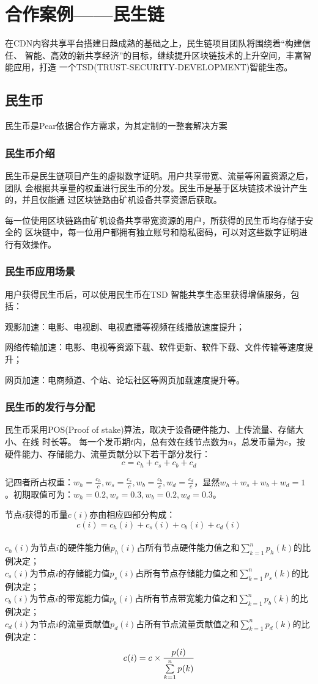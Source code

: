 \chapter{合作案例——民生链}
在CDN内容共享平台搭建日趋成熟的基础之上，民生链项目团队将围绕着“构建信任、
智能、⾼效的新共享经济”的目标，继续提升区块链技术的上升空间，丰富智能应用，打造
一个TSD(TRUST-SECURITY-DEVELOPMENT)智能生态。
\section{民生币}
民生币是Pear依据合作方需求，为其定制的一整套解决方案
\subsection{民生币介绍}
民生币是民生链项目产生的虚拟数字证明。用户共享带宽、流量等闲置资源之后，团队
会根据共享量的权重进行民生币的分发。民生币是基于区块链技术设计产生的，并且仅能通
过区块链路由矿机设备共享资源后获取。\par 
每一位使用区块链路由矿机设备共享带宽资源的用户，所获得的民生币均存储于安全的
区块链中，每一位用户都拥有独立账号和隐私密码，可以对这些数字证明进行有效操作。
\subsection{民生币应用场景}
用户获得民生币后，可以使用民生币在TSD 智能共享生态里获得增值服务，包括：\par 
观影加速：电影、电视剧、电视直播等视频在线播放速度提升；\par 
网络传输加速：电影、电视等资源下载、软件更新、软件下载、文件传输等速度提升；\par 
网页加速：电商频道、个站、论坛社区等网页加载速度提升等。
\subsection{民生币的发行与分配}
民生币采用POS(Proof of stake)算法，取决于设备硬件能力、上传流量、存储大小、在线
时长等。
每一个发币期$t$内，总有效在线节点数为$n$，总发币量为$c$，按硬件能力、存储能力、流量贡献分以下若干部分发行：
  $$c = c_h + c_s + c_b + c_d$$

记四者所占权重：$w_h = \frac{c_h}{c}, w_s = \frac{c_s}{c}, w_b = \frac{c_b}{c}, w_d = \frac{c_d}{c}$，显然$w_h + w_s + w_b + w_d = 1$。初期取值可为：$w_h = 0.2, w_s = 0.3, w_b = 0.2,  w_d = 0.3$。

节点$i$获得的币量$c(i)$亦由相应四部分构成：
$$c(i) = c_h(i) + c_s(i) + c_b(i) + c_d(i)$$\\
 $c_h(i)$为节点$i$的硬件能力值$p_h(i)$占所有节点硬件能力值之和$\sum_{k=1}^n{p_h(k)}$的比例决定；\\
$c_s(i)$为节点$i$的存储能力值$p_s(i)$占所有节点存储能力值之和$\sum_{k=1}^n{p_s(k)}$的比例决定；\\
$c_b(i)$为节点$i$的带宽能力值$p_b(i)$占所有节点带宽能力值之和$\sum_{k=1}^n{p_b(k)}$的比例决定；\\
$c_d(i)$为节点$i$的流量贡献值$p_d(i)$占所有节点流量贡献值之和$\sum_{k=1}^n{p_d(k)}$的比例决定：\\
$$c_{\*}(i) = c_{\*}\times \frac{p_{\*}(i)}{\sum\limits_{k=1}^n{p_{\*}(k)}}$$

